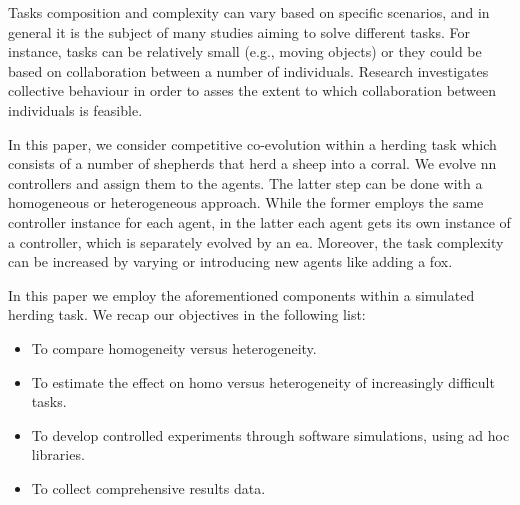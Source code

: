 \documentclass[conference]{IEEEtran}
\begin{document}
Tasks composition and complexity can vary based on specific scenarios, and in general it is the subject of many studies aiming to solve different tasks.
For instance, tasks can be relatively small (e.g., moving objects) or they could be based on collaboration between a number of individuals.
Research investigates collective behaviour in order to asses the extent to which collaboration between individuals is feasible.  

In this paper, we consider competitive co-evolution within a herding task which consists of a number of shepherds that herd a sheep into a corral.
We evolve \gls{nn} controllers and assign them to the agents. The latter step can be done with a homogeneous or heterogeneous approach.
While the former employs the same controller instance for each agent,
in the latter each agent gets its own instance of a controller, which is separately evolved by an \gls{ea}.
Moreover, the task complexity can be increased by varying or introducing new agents like adding a fox.

In this paper we employ the aforementioned components within a simulated herding task.
We recap our objectives in the following list:

\begin{itemize}
	\item To compare homogeneity versus heterogeneity.
	\item To estimate the effect on homo versus heterogeneity of increasingly difficult tasks.
 	\item To develop controlled experiments through software simulations, using ad hoc libraries.
	\item To collect comprehensive results data.
\end{itemize}
 
\end{document}
